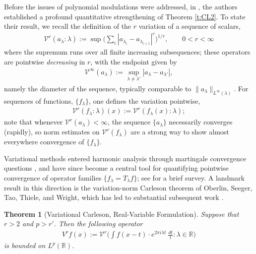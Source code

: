 \documentclass[12pt]{amsart}
\numberwithin{equation}{section}
\newtheorem{theorem}{Theorem}[section]
\theoremstyle{definition}
\begin{document}
Before the issues of polynomial modulations were addressed, in \cite{O+}, the authors established a profound quantitative strengthening of Theorem \ref{t:CL2}. To state their result, we recall the definition of the $r$ variation of a sequence of scalars,
\begin{align}
    \mathcal{V}^r(a_\lambda : \lambda) := \sup \big( \sum_{i} |a_{\lambda_i} - a_{\lambda_{i+1}}|^r \big)^{1/r}, \qquad 0 < r < \infty
\end{align}
where the supremum runs over all finite increasing subsequences; these operators are pointwise \emph{decreasing} in $r$, with the endpoint given by
\begin{align}
    \mathcal{V}^\infty(a_\lambda) := \sup_{\lambda \neq \lambda'} |a_{\lambda} - a_{\lambda'}|,
\end{align}
namely the diameter of the sequence, typically comparable to $\| a_\lambda \|_{L^\infty(\lambda)}$. For sequences of functions, $\{ f_\lambda \}$, one defines the variation pointwise,
\begin{align}\label{e:fxnvar}
    \mathcal{V}^r(f_\lambda:\lambda)(x) :=     \mathcal{V}^r(f_\lambda(x):\lambda); 
\end{align}
note that whenever $ \mathcal{V}^r(a_\lambda) < \infty$, the sequence $\{a_\lambda\}$ necessarily converges (rapidly), so norm estimates on $\mathcal{V}^r(f_\lambda)$ are a strong way to show almost everywhere convergence of $\{ f_\lambda\}$.

Variational methods entered harmonic analysis through martingale convergence
questions \cite{LE}, and have since become a central tool for quantifying
pointwise convergence of operator families \(\{ f_\lambda=T_\lambda f \}\); see \cite{BK} for a brief survey.  A landmark result in this direction is the variation-norm Carleson theorem of Oberlin, Seeger, Tao, Thiele, and Wright, which has led to substantial subsequent work \cite{AU,BM,U}.

\begin{theorem}[Variational Carleson, Real-Variable Formulation]\label{t:Var}
    Suppose that $r > 2$ and $p > r'$. Then the following operator
    \begin{align}
        V^r f(x) := \mathcal{V}^r \big( \int f(x-t) \cdot  e^{2 \pi i \lambda t} \ \frac{dt}{t} : \lambda \in \mathbb{R} \big)
    \end{align}
    is bounded on $L^p(\mathbb{R})$.
\end{theorem}
\end{document}
